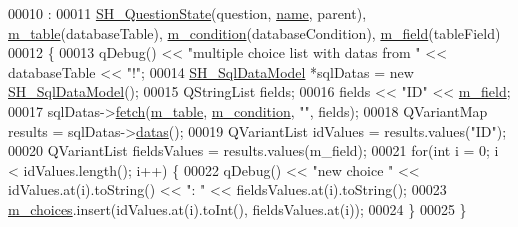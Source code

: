 \begin{DoxyCode}
00010                                                                                                            
                                                                                :
00011     \hyperlink{classSH__QuestionState_ad7ea575ec284d1dc89da5df9f31cd751}{SH\_QuestionState}(question, \hyperlink{classSH__NamedObject_a9f686c6f2a5bcc08ad03d0cee0151f0f}{name}, parent), \hyperlink{classSH__DatabaseContentQuestionState_a95d8a6ffc051cd9283314a56f7a11296}{m\_table}(databaseTable), 
      \hyperlink{classSH__DatabaseContentQuestionState_aaffd467fccc69b6d46194f04831a1edc}{m\_condition}(databaseCondition), \hyperlink{classSH__DatabaseContentQuestionState_a32b3f4f2cadbc4837add2556c1a926d4}{m\_field}(tableField)
00012 \{
00013     qDebug() << \textcolor{stringliteral}{"multiple choice list with datas from "} << databaseTable << \textcolor{stringliteral}{"!"};
00014     \hyperlink{classSH__SqlDataModel}{SH\_SqlDataModel} *sqlDatas = \textcolor{keyword}{new} \hyperlink{classSH__SqlDataModel}{SH\_SqlDataModel}();
00015     QStringList fields;
00016     fields << \textcolor{stringliteral}{"ID"} << \hyperlink{classSH__DatabaseContentQuestionState_a32b3f4f2cadbc4837add2556c1a926d4}{m\_field};
00017     sqlDatas->\hyperlink{classSH__SqlDataModel_ab6c206088250a66ddc8cb8d33a38e421}{fetch}(\hyperlink{classSH__DatabaseContentQuestionState_a95d8a6ffc051cd9283314a56f7a11296}{m\_table}, \hyperlink{classSH__DatabaseContentQuestionState_aaffd467fccc69b6d46194f04831a1edc}{m\_condition}, \textcolor{stringliteral}{""}, fields);
00018     QVariantMap results = sqlDatas->\hyperlink{classSH__SqlDataModel_a24db284b370930b57e2261a7a72e2da8}{datas}();
00019     QVariantList idValues = results.values(\textcolor{stringliteral}{"ID"});
00020     QVariantList fieldsValues = results.values(m\_field);
00021     \textcolor{keywordflow}{for}(\textcolor{keywordtype}{int} i = 0; i < idValues.length(); i++) \{
00022         qDebug() << \textcolor{stringliteral}{"new choice "} << idValues.at(i).toString() <<  \textcolor{stringliteral}{": "} << fieldsValues.at(i).toString();
00023         \hyperlink{classSH__DatabaseContentQuestionState_a0bbbd0d3b22877dc9e78f81136f31618}{m\_choices}.insert(idValues.at(i).toInt(), fieldsValues.at(i));
00024     \}
00025 \}
\end{DoxyCode}


